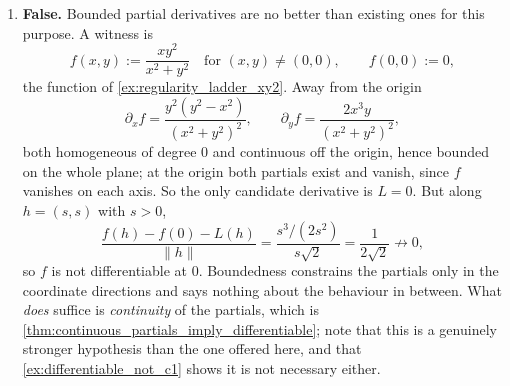 \begin{exercisesolution}
\begin{enumerate}[label=\textbf{(\alph*)}]
  \item \textbf{False.} Bounded partial derivatives are no better than existing ones for this
    purpose. A witness is
    \[f(x,y) := \frac{xy^2}{x^2+y^2} \quad \text{for } (x,y)\neq(0,0), \qquad f(0,0) := 0,\]
    the function of \cref{ex:regularity_ladder_xy2}. Away from the origin
    \[\partial_xf = \frac{y^2(y^2-x^2)}{(x^2+y^2)^2}, \qquad
      \partial_yf = \frac{2x^3y}{(x^2+y^2)^2},\]
    both homogeneous of degree $0$ and continuous off the origin, hence bounded on the whole
    plane; at the origin both partials exist and vanish, since $f$ vanishes on each axis. So the
    only candidate derivative is $L = 0$. But along $h = (s,s)$ with $s > 0$,
    \[\frac{f(h)-f(0)-L(h)}{\lVert h\rVert} = \frac{s^3/(2s^2)}{s\sqrt2} = \frac{1}{2\sqrt2}
      \not\to 0,\]
    so $f$ is not differentiable at $0$. Boundedness constrains the partials only in the
    coordinate directions and says nothing about the behaviour in between. What \emph{does}
    suffice is \emph{continuity} of the partials, which is
    \cref{thm:continuous_partials_imply_differentiable}; note that this is a genuinely stronger
    hypothesis than the one offered here, and that \cref{ex:differentiable_not_c1} shows it is not
    necessary either.
\end{enumerate}
\end{exercisesolution}
